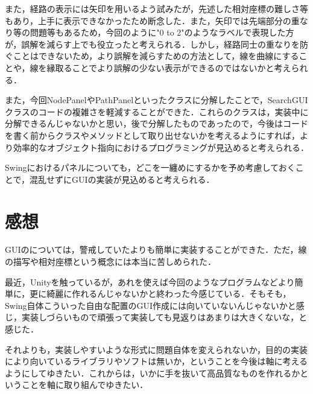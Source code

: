 \documentclass[12pt]{jarticle}
\begin{document}
また，経路の表示には矢印を用いるよう試みたが，先述した相対座標の難しさ等もあり，上手に表示できなかったため断念した．また，矢印では先端部分の重なり等の問題等もあるため，今回のように"0 to 2"のようなラベルで表現した方が，誤解を減らす上でも役立ったと考えられる．しかし，経路同士の重なりを防ぐことはできないため，より誤解を減らすための方法として，線を曲線にすることや，線を縁取ることでより誤解の少ない表示ができるのではないかと考えられる．

また，今回NodePanelやPathPanelといったクラスに分解したことで，SearchGUIクラスのコードの複雑さを軽減することができた．これらのクラスは，実装中に分解できるんじゃないかと思い，後で分解したものであったので，今後はコードを書く前からクラスやメソッドとして取り出せないかを考えるようにすれば，より効率的なオブジェクト指向におけるプログラミングが見込めると考えられる．

Swingにおけるパネルについても，どこを一纏めにするかを予め考慮しておくことで，混乱せずにGUIの実装が見込めると考えられる．

\section{感想}
GUIのについては，警戒していたよりも簡単に実装することができた．ただ，線の描写や相対座標という概念には本当に苦しめられた．

最近，Unityを触っているが，あれを使えば今回のようなプログラムなどより簡単に，更に綺麗に作れるんじゃないかと終わった今感じている．そもそも，Swing自体こういった自由な配置のGUI作成には向いていないんじゃないかと感じ，実装しづらいもので頑張って実装しても見返りはあまりは大きくないな，と感じた．

それよりも，実装しやすいような形式に問題自体を変えられないか，目的の実装により向いているライブラリやソフトは無いか，ということを今後は軸に考えるようにしてゆきたい．これからは，いかに手を抜いて高品質なものを作れるかということを軸に取り組んでゆきたい．
\end{document}
